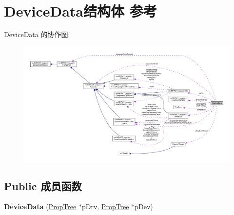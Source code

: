 \hypertarget{struct_device_data}{\section{Device\+Data结构体 参考}
\label{struct_device_data}
}


Device\+Data 的协作图\+:
\nopagebreak
\begin{figure}[H]
\begin{center}
\leavevmode
\includegraphics[width=350pt]{struct_device_data__coll__graph}
\end{center}
\end{figure}
\subsection*{Public 成员函数}
\begin{DoxyCompactItemize}
\item 
\hypertarget{struct_device_data_afe34dc60762ff23b5acd229a68562d07}{{\bfseries Device\+Data} (\hyperlink{class_prop_tree}{Prop\+Tree} $\ast$p\+Drv, \hyperlink{class_prop_tree}{Prop\+Tree} $\ast$p\+Dev)}\label{struct_device_data_afe34dc60762ff23b5acd229a68562d07}

\end{DoxyCompactItemize}
